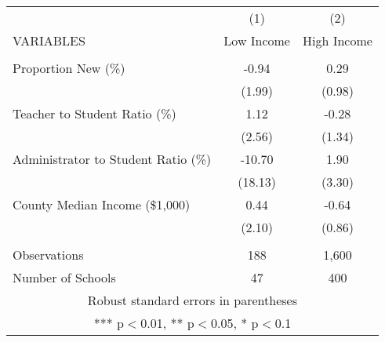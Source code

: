 \begin{tabular}{lcc}
\hline\hline
 & (1) & (2) \\
VARIABLES & Low Income & High Income \\ \hline
 &  &  \\
Proportion New (\%) & -0.94 & 0.29 \\
 & (1.99) & (0.98) \\
Teacher to Student Ratio (\%) & 1.12 & -0.28 \\
 & (2.56) & (1.34) \\
Administrator to Student Ratio (\%) & -10.70 & 1.90 \\
 & (18.13) & (3.30) \\
County Median Income (\$1,000) & 0.44 & -0.64 \\
 & (2.10) & (0.86) \\
 &  &  \\
Observations & 188 & 1,600 \\
 Number of Schools & 47 & 400 \\ \hline\hline
\multicolumn{3}{c}{ Robust standard errors in parentheses} \\
\multicolumn{3}{c}{ *** p$<$0.01, ** p$<$0.05, * p$<$0.1} \\
\end{tabular}
